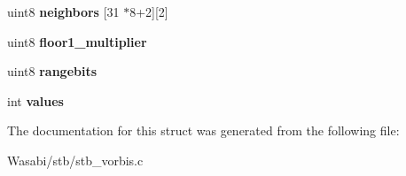 \begin{DoxyCompactItemize}
\item 
uint8 {\bfseries neighbors} \mbox{[}31 $\ast$8+2\mbox{]}\mbox{[}2\mbox{]}\hypertarget{struct_floor1_a468a990afb1f3735d90992ec66a959d5}{}\label{struct_floor1_a468a990afb1f3735d90992ec66a959d5}

\item 
uint8 {\bfseries floor1\+\_\+multiplier}\hypertarget{struct_floor1_a38aa153cbf396cc55c05c67489965c73}{}\label{struct_floor1_a38aa153cbf396cc55c05c67489965c73}

\item 
uint8 {\bfseries rangebits}\hypertarget{struct_floor1_a9edbc16be44c59b3374e7495c300098a}{}\label{struct_floor1_a9edbc16be44c59b3374e7495c300098a}

\item 
int {\bfseries values}\hypertarget{struct_floor1_a9a426cc6574076ad9e5d969a56af41f4}{}\label{struct_floor1_a9a426cc6574076ad9e5d969a56af41f4}

\end{DoxyCompactItemize}


The documentation for this struct was generated from the following file\+:\begin{DoxyCompactItemize}
\item 
Wasabi/stb/stb\+\_\+vorbis.\+c\end{DoxyCompactItemize}
